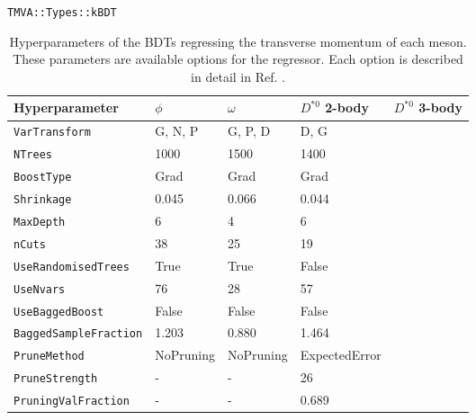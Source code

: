 \begin{table}[!ht]
    \begin{lrbox}{\verbbox}
        \footnotesize
        \verb+TMVA::Types::kBDT+
    \end{lrbox}
    \centering
    \begin{tabular}{|l|C{2.45cm}|C{2.45cm}|C{2.45cm}|C{2.45cm}|}
        \hline
        Hyperparameter & $\phi$ & $\omega$ & $D^{*0}$ 2-body & $D^{*0}$ 3-body \\ \hline
        \verb+VarTransform+         &G, N, P&G, P, D&D, G   &    \\
        \verb+NTrees+               &1000   &1500   &1400   &    \\
        \verb+BoostType+            &Grad   &Grad   &Grad   &    \\
        \verb+Shrinkage+            &0.045  &0.066  &0.044  &    \\
        \verb+MaxDepth+             &6      &4      &6      &    \\
        \verb+nCuts+                &38     &25     &19     &    \\
        \verb+UseRandomisedTrees+   &True   &True   &False   &    \\
        \verb+UseNvars+             &76     &28     &57     &    \\
        \verb+UseBaggedBoost+       &False  &False  &False   &    \\
        \verb+BaggedSampleFraction+ &1.203  &0.880  &1.464 &    \\
        \verb+PruneMethod+          &NoPruning&NoPruning&ExpectedError&    \\
        \verb+PruneStrength+        &-      &-      &26     &    \\
        \verb+PruningValFraction+   &-      &-      &0.689 &    \\
        \hline
        \end{tabular}
    \caption{Hyperparameters of the BDTs regressing the transverse momentum of each meson. These parameters are available options for the \usebox{\verbbox} regressor. Each option is described in detail in Ref. \cite{TMVA:2007ngy}.}
    \label{tab:hyperparameters_models}
\end{table}

